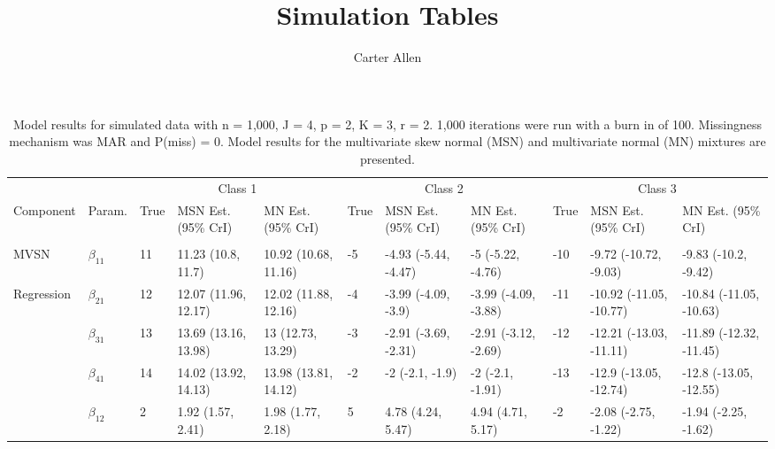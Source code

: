 \documentclass[]{article}
\title{Simulation Tables}
\author{Carter Allen}
\date{}
\begin{document}
\maketitle

\begin{landscape}\begin{table}[t]

\caption{\label{tab:unnamed-chunk-5}Model results for simulated data with n = 1,000, J = 4, p = 2, K = 3, r = 2. 1,000 iterations were run with a burn in of 100. Missingness mechanism was MAR and P(miss) = 0. Model results for the multivariate skew normal (MSN) and multivariate normal (MN) mixtures are presented.}
\centering
\fontsize{7}{9}\selectfont
\begin{tabular}{lllllllllll}
\toprule
\multicolumn{2}{c}{ } & \multicolumn{3}{c}{Class 1} & \multicolumn{3}{c}{Class 2} & \multicolumn{3}{c}{Class 3} \\
\cmidrule(l{3pt}r{3pt}){3-5} \cmidrule(l{3pt}r{3pt}){6-8} \cmidrule(l{3pt}r{3pt}){9-11}
Component & Param. & True & MSN Est. (95\% CrI) & MN Est. (95\% CrI)  & True & MSN Est. (95\% CrI) & MN Est. (95\% CrI) & True & MSN Est. (95\% CrI) & MN Est. (95\% CrI)\\
\midrule
\addlinespace[0.3em]
\multicolumn{11}{l}{\textbf{ }}\\
\hspace{1em}MVSN & $\beta_{11}$ & 11 & 11.23 (10.8, 11.7) & 10.92 (10.68, 11.16) & -5 & -4.93 (-5.44, -4.47) & -5 (-5.22, -4.76) & -10 & -9.72 (-10.72, -9.03) & -9.83 (-10.2, -9.42)\\
\hspace{1em}Regression & $\beta_{21}$ & 12 & 12.07 (11.96, 12.17) & 12.02 (11.88, 12.16) & -4 & -3.99 (-4.09, -3.9) & -3.99 (-4.09, -3.88) & -11 & -10.92 (-11.05, -10.77) & -10.84 (-11.05, -10.63)\\
\hspace{1em} & $\beta_{31}$ & 13 & 13.69 (13.16, 13.98) & 13 (12.73, 13.29) & -3 & -2.91 (-3.69, -2.31) & -2.91 (-3.12, -2.69) & -12 & -12.21 (-13.03, -11.11) & -11.89 (-12.32, -11.45)\\
\hspace{1em} & $\beta_{41}$ & 14 & 14.02 (13.92, 14.13) & 13.98 (13.81, 14.12) & -2 & -2 (-2.1, -1.9) & -2 (-2.1, -1.91) & -13 & -12.9 (-13.05, -12.74) & -12.8 (-13.05, -12.55)\\
\hspace{1em} & $\beta_{12}$ & 2 & 1.92 (1.57, 2.41) & 1.98 (1.77, 2.18) & 5 & 4.78 (4.24, 5.47) & 4.94 (4.71, 5.17) & -2 & -2.08 (-2.75, -1.22) & -1.94 (-2.25, -1.62)\\

\end{tabular}
\end{table}
\end{landscape}
\end{document}
